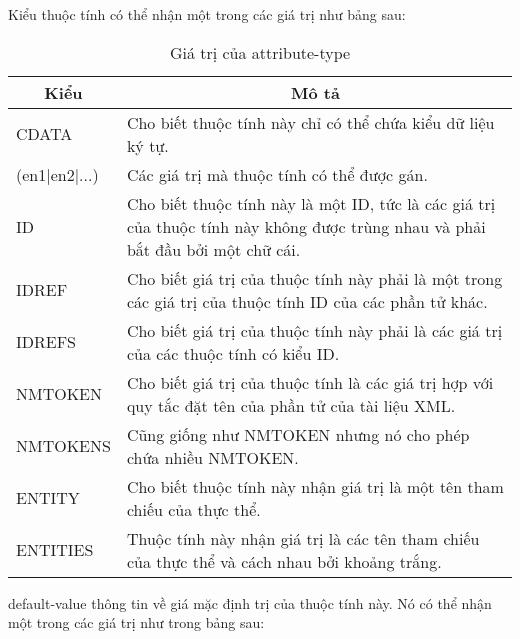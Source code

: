    Kiểu thuộc tính có thể nhận một trong các giá trị như bảng sau:
\begin{center}
 \begin{longtable}{|m{2.5cm}|m{9cm}|}
\caption[Giá trị của attribute-type]{Giá trị của attribute-type}
 \endfirsthead
 \endhead
 \hline

 \multicolumn{1}{|c|}{\textbf{Kiểu}} &	
 \multicolumn{1}{c|}{ \textbf{Mô tả}}  \\
 \hline	
CDATA&	Cho biết thuộc tính này chỉ có thể chứa kiểu dữ liệu ký tự. \\
 \hline	
(en1|en2|...) &	Các giá trị mà thuộc tính có thể được gán.\\
 \hline	
ID&	Cho biết thuộc tính này là một ID, tức là các giá trị của thuộc tính này không được trùng nhau và phải bắt đầu bởi một chữ cái.\\
 \hline	
IDREF&	Cho biết giá trị của thuộc tính này phải là một trong các giá trị của thuộc tính ID của các phần tử khác.\\
 \hline	
IDREFS&	Cho biết giá trị của thuộc tính này phải là các giá trị của các thuộc tính có kiểu ID.\\
 \hline	
NMTOKEN&	Cho biết giá trị của thuộc tính là các giá trị hợp với quy tắc đặt tên của phần tử của tài liệu XML.\\ 
NMTOKENS &	Cũng giống như NMTOKEN nhưng nó cho phép chứa nhiều NMTOKEN.\\
 \hline	
ENTITY	& Cho biết thuộc tính này nhận giá trị là một tên tham chiếu của thực thể.\\
 \hline	
ENTITIES & Thuộc tính này nhận giá trị là các tên tham chiếu của thực thể và cách nhau bởi khoảng trắng.\\
 \hline	
\end{longtable}

\end{center}
\vspace{-1cm}

{ \ttfamily default-value} thông tin về giá mặc định trị của thuộc tính này. Nó có thể nhận một trong các giá trị như trong bảng sau:
 
